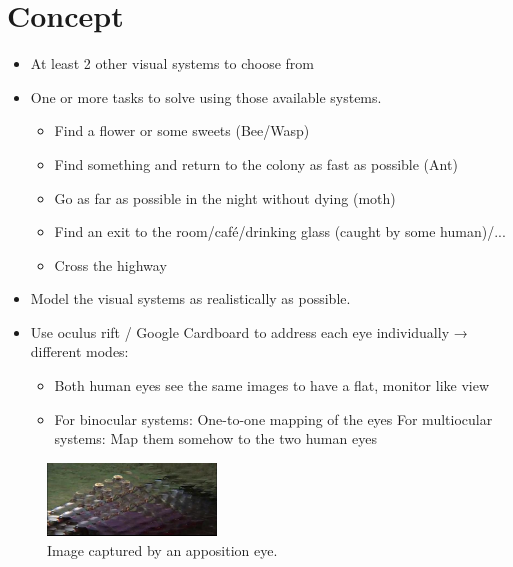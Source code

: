 \documentclass{acm_proc_article-sp}
\begin{document}
\section{Concept}
\begin{itemize}
\item At least 2 other visual systems to choose from
\item One or more tasks to solve using those available systems.
  \begin{itemize}
    \item Find a flower or some sweets (Bee/Wasp)
    \item Find something and return to the colony as fast as possible (Ant)
    \item Go as far as possible in the night without dying (moth)
    \item Find an exit to the room/café/drinking glass (caught by some human)/...
    \item Cross the highway
  \end{itemize}
\item Model the visual systems as realistically as possible.
\item Use oculus rift / Google Cardboard to address each eye individually
→ different modes:
  \begin{itemize}
  \item Both human eyes see the same images to have a flat, monitor like view
  \item For binocular systems: One-to-one mapping of the eyes
        For multiocular systems: Map them somehow to the two human eyes
  \end{itemize}
\end{itemize}

\begin{figure}
  \centering
  \includegraphics[width=0.4\textwidth]{bee-vision.jpg}
  \caption{Image captured by an apposition eye.}
  \label{appositeeye}
\end{figure}
\end{document}
